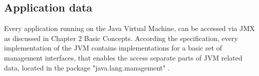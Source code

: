 %
%
%
%
%
\subsection{Application data}

Every application running on the Java Virtual Machine, can be accessed via JMX as discussed
in Chapter 2 Basic Concepts. According the specification, every implementation of the JVM contains
implementations for a basic set of management interfaces, that enables the access separate parts of JVM related data,
located in the package "java.lang.management" \cite{Javadoc16}.

